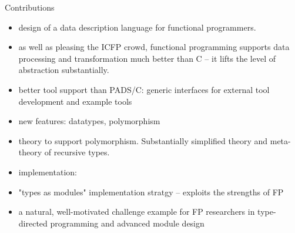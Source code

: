 Contributions
\begin{itemize}
\item design of a data description language for functional programmers.
\item as well as pleasing the ICFP crowd, functional programming
  supports data processing and transformation much better than C -- it
  lifts the level of abstraction substantially.
\item better tool support than PADS/C: generic interfaces for external
  tool development and example tools
\item new features: datatypes, polymorphism
\item theory to support polymorphism. Substantially simplified theory and
meta-theory of recursive types.
\item implementation:
\item "types as modules" implementation stratgy -- exploits the strengths of FP
\item a natural, well-motivated challenge example for FP researchers
  in type-directed programming and advanced module design
\end{itemize}




